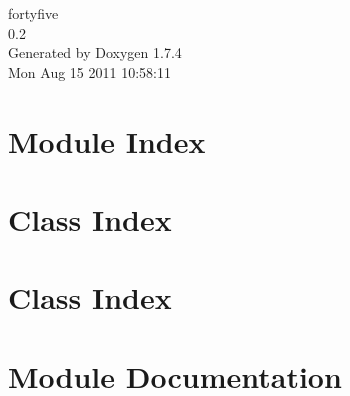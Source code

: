 \documentclass[a4paper]{book}
\begin{document}
\hypersetup{pageanchor=false}
\begin{titlepage}
\vspace*{7cm}
\begin{center}
{\Large fortyfive \\[1ex]\large 0.2 }\\
\vspace*{1cm}
{\large Generated by Doxygen 1.7.4}\\
\vspace*{0.5cm}
{\small Mon Aug 15 2011 10:58:11}\\
\end{center}
\end{titlepage}
\clearemptydoublepage
{}
\tableofcontents
\clearemptydoublepage
{}
\hypersetup{pageanchor=true}
\chapter{Module Index}

\chapter{Class Index}

\chapter{Class Index}

\chapter{Module Documentation}


















\end{document}

